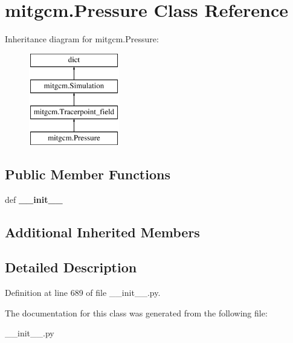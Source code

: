 \hypertarget{classmitgcm_1_1Pressure}{\section{mitgcm.\+Pressure Class Reference}
\label{classmitgcm_1_1Pressure}
}
Inheritance diagram for mitgcm.\+Pressure\+:\begin{figure}[H]
\begin{center}
\leavevmode
\includegraphics[height=4.000000cm]{classmitgcm_1_1Pressure}
\end{center}
\end{figure}
\subsection*{Public Member Functions}
\begin{DoxyCompactItemize}
\item 
\hypertarget{classmitgcm_1_1Pressure_a8233e6b8676c7405e760cdfea4f1bde3}{def {\bfseries \+\_\+\+\_\+init\+\_\+\+\_\+}}\label{classmitgcm_1_1Pressure_a8233e6b8676c7405e760cdfea4f1bde3}

\end{DoxyCompactItemize}
\subsection*{Additional Inherited Members}


\subsection{Detailed Description}


Definition at line 689 of file \+\_\+\+\_\+init\+\_\+\+\_\+.\+py.



The documentation for this class was generated from the following file\+:\begin{DoxyCompactItemize}
\item 
\+\_\+\+\_\+init\+\_\+\+\_\+.\+py\end{DoxyCompactItemize}

